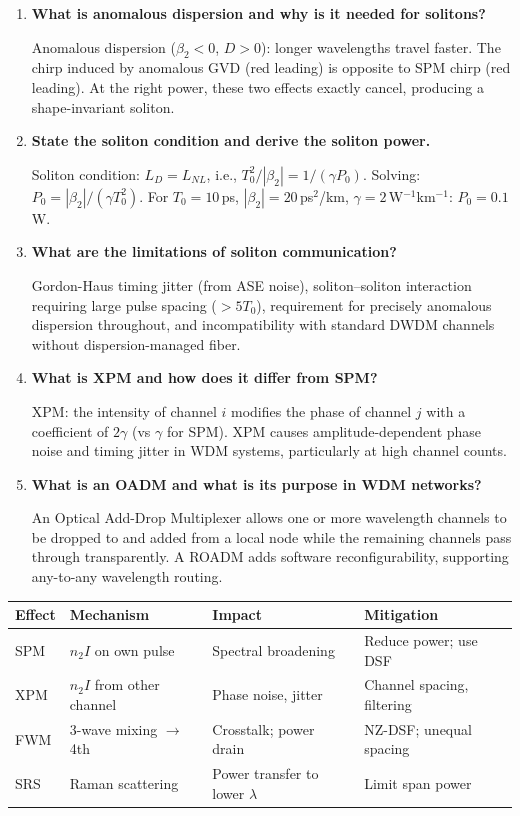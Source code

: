 \documentclass[12pt,a4paper]{article}
\newcommand{\Q}[1]{\textbf{#1}\par\noindent\ignorespaces}
\renewcommand{\arraystretch}{1.45}
\begin{document}
\begin{tcolorbox}[exambox, title={\textbf{Frequently Asked / Viva Questions}}]
\begin{enumerate}[topsep=0pt, label=\textbf{Q\arabic*.}, itemsep=5pt]
  \item \Q{What is anomalous dispersion and why is it needed for solitons?}
    Anomalous dispersion ($\beta_2 < 0$, $D > 0$): longer wavelengths travel faster. The chirp induced by anomalous GVD (red leading) is opposite to SPM chirp (red leading). At the right power, these two effects exactly cancel, producing a shape-invariant soliton.
  \item \Q{State the soliton condition and derive the soliton power.}
    Soliton condition: $L_D = L_{NL}$, i.e., $T_0^2/|\beta_2| = 1/(\gamma P_0)$. Solving: $P_0 = |\beta_2|/(\gamma T_0^2)$. For $T_0 = 10$\,ps, $|\beta_2| = 20$\,ps$^2$/km, $\gamma = 2$\,W$^{-1}$km$^{-1}$: $P_0 = 0.1$\,W.
  \item \Q{What are the limitations of soliton communication?}
    Gordon-Haus timing jitter (from ASE noise), soliton--soliton interaction requiring large pulse spacing ($>5T_0$), requirement for precisely anomalous dispersion throughout, and incompatibility with standard DWDM channels without dispersion-managed fiber.
  \item \Q{What is XPM and how does it differ from SPM?}
    XPM: the intensity of channel $i$ modifies the phase of channel $j$ with a coefficient of $2\gamma$ (vs $\gamma$ for SPM). XPM causes amplitude-dependent phase noise and timing jitter in WDM systems, particularly at high channel counts.
  \item \Q{What is an OADM and what is its purpose in WDM networks?}
    An Optical Add-Drop Multiplexer allows one or more wavelength channels to be dropped to and added from a local node while the remaining channels pass through transparently. A ROADM adds software reconfigurability, supporting any-to-any wavelength routing.
\end{enumerate}
\end{tcolorbox}

\begin{tcolorbox}[tikzbox, title={Nonlinear Effects --- Summary Comparison}]
\centering
{\renewcommand{\arraystretch}{1.45}
\begin{tabularx}{\linewidth}{|B{2.5cm}|Y|Y|Y|}
\hline
\textbf{Effect} & \textbf{Mechanism} & \textbf{Impact} & \textbf{Mitigation} \\
\hline
SPM & $n_2 I$ on own pulse & Spectral broadening & Reduce power; use DSF \\
\hline
XPM & $n_2 I$ from other channel & Phase noise, jitter & Channel spacing, filtering \\
\hline
FWM & 3-wave mixing $\to$ 4th & Crosstalk; power drain & NZ-DSF; unequal spacing \\
\hline
SRS & Raman scattering & Power transfer to lower $\lambda$ & Limit span power \\
\hline
\end{tabularx}}
\end{tcolorbox}
\end{document}
